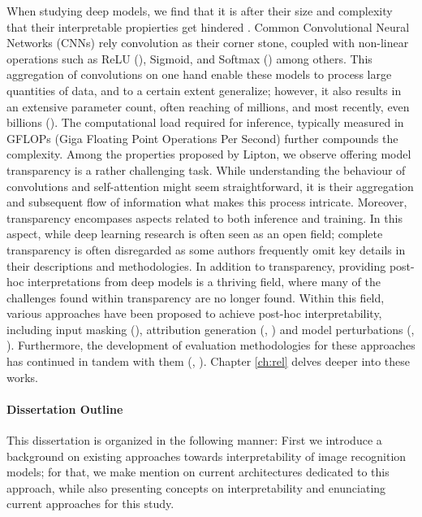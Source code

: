 When studying deep models, we find that  it is after their size and complexity that their 
interpretable propierties get hindered . Common Convolutional Neural Networks (CNNs) 
rely convolution as their corner stone, coupled with non-linear operations such as 
ReLU (\cite{fukushima1975cognitron}), Sigmoid, and Softmax (\cite{hopfield1985neural}) among others.
This aggregation of convolutions on one hand enable these models to process large quantities of 
data, and to a certain extent generalize; however, it also results in an extensive parameter count,
often reaching of millions, and most recently, even billions (\cite{openai_compute}). The 
computational load required for inference, typically measured in GFLOPs (Giga Floating Point 
Operations Per Second) further compounds the complexity.
\noindent Among the properties proposed by Lipton, we observe offering model transparency is a rather 
challenging task. While understanding the behaviour of convolutions and 
self-attention might seem straightforward, it is their aggregation and subsequent flow of information what 
makes this process intricate. Moreover,  transparency encompases aspects related to both
inference and training. In this aspect, while deep learning research is often seen as an open field;
complete transparency is often disregarded as some authors frequently omit key details in their 
descriptions and methodologies. 
\noindent In addition to transparency, providing post-hoc interpretations from deep models is a 
thriving field, where many of the challenges found within transparency are no longer found.
Within this field, various approaches have been proposed to achieve post-hoc interpretability,
including input masking (\cite{petsiuk2018rise}), attribution generation (\cite{NIPS2017_7062}, 
\cite{zhou2016learning}) and model perturbations 
(\cite{fong2017interpretable}, \cite{fong2019understanding}). Furthermore, the development of 
evaluation methodologies for these approaches has continued in tandem with them 
(\cite{choe2020evaluating}, \cite{chattopadhay2018grad}). Chapter \ref{ch:rel} delves deeper into 
these works. 

\paragraph{Dissertation Outline}
\noindent This dissertation is organized in the following manner: First we introduce a background 
on existing approaches towards interpretability of image recognition models; for that, we make 
mention on  current architectures dedicated to this approach, while also presenting concepts on 
interpretability and enunciating current approaches for this study. \\


